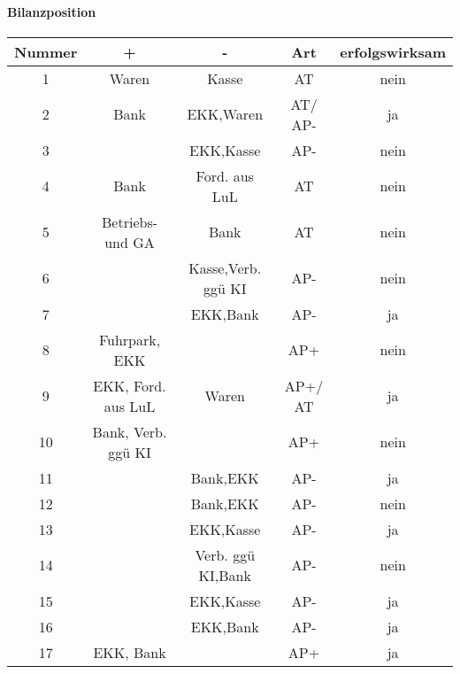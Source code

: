 \documentclass[paper=a4, fontsize=11pt]{scrartcl}
\numberwithin{equation}{section}
\numberwithin{figure}{section}
\numberwithin{table}{section}
\begin{document}
\paragraph{Bilanzposition}
\begin{tabular}{|c|c|c|c|c|}
\hline
Nummer & + & - & Art & erfolgswirksam \\\hline
1 & Waren & Kasse & AT & nein \\
2 & Bank & EKK,Waren & AT/ AP- & ja \\
3 & & EKK,Kasse & AP- & nein\\
4 & Bank & Ford. aus LuL & AT & nein\\
5 & Betriebs- und GA & Bank & AT & nein \\
6 & & Kasse,Verb. ggü KI & AP- & nein \\
7 & & EKK,Bank & AP- & ja \\
8 & Fuhrpark, EKK & & AP+ & nein \\
9 & EKK, Ford. aus LuL & Waren & AP+/ AT & ja \\
10 & Bank, Verb. ggü KI & & AP+ & nein \\
11 & & Bank,EKK & AP- & ja \\
12 & & Bank,EKK & AP- & nein \\
13 & & EKK,Kasse & AP- & ja \\
14 & & Verb. ggü KI,Bank & AP- & nein \\
15 & & EKK,Kasse & AP- & ja \\
16 & & EKK,Bank & AP- & ja \\
17 & EKK, Bank & & AP+ & ja \\ \hline
\end{tabular}
\end{document}
